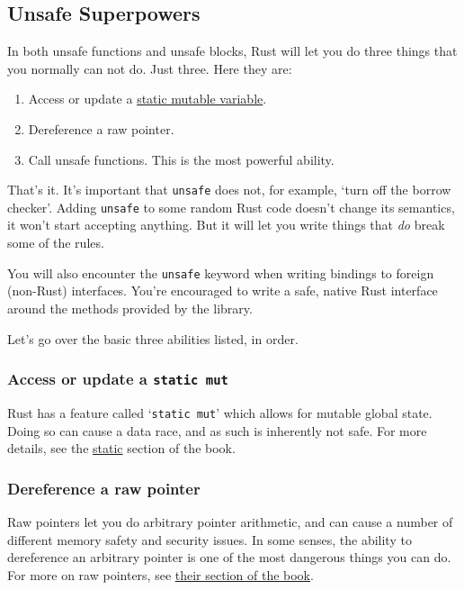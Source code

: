 \documentclass[a4paper,]{book}
\providecommand{\tightlist}{%
  \setlength{\itemsep}{0pt}\setlength{\parskip}{0pt}}
\begin{document}
\subsection{Unsafe Superpowers}\label{unsafe-superpowers}

In both unsafe functions and unsafe blocks, Rust will let you do three
things that you normally can not do. Just three. Here they are:

\begin{enumerate}
\def\labelenumi{\arabic{enumi}.}
\tightlist
\item
  Access or update a \protect\hyperlink{static}{static mutable
  variable}.
\item
  Dereference a raw pointer.
\item
  Call unsafe functions. This is the most powerful ability.
\end{enumerate}

That's it. It's important that \texttt{unsafe} does not, for example,
`turn off the borrow checker'. Adding \texttt{unsafe} to some random
Rust code doesn't change its semantics, it won't start accepting
anything. But it will let you write things that \emph{do} break some of
the rules.

You will also encounter the \texttt{unsafe} keyword when writing
bindings to foreign (non-Rust) interfaces. You're encouraged to write a
safe, native Rust interface around the methods provided by the library.

Let's go over the basic three abilities listed, in order.

\subsubsection{\texorpdfstring{Access or update a
\texttt{static\ mut}}{Access or update a static mut}}\label{access-or-update-a-static-mut}

Rust has a feature called `\texttt{static\ mut}' which allows for
mutable global state. Doing so can cause a data race, and as such is
inherently not safe. For more details, see the
\protect\hyperlink{static}{static} section of the book.

\subsubsection{Dereference a raw
pointer}\label{dereference-a-raw-pointer}

Raw pointers let you do arbitrary pointer arithmetic, and can cause a
number of different memory safety and security issues. In some senses,
the ability to dereference an arbitrary pointer is one of the most
dangerous things you can do. For more on raw pointers, see
\protect\hyperlink{sec--raw-pointers}{their section of the book}.
\end{document}
